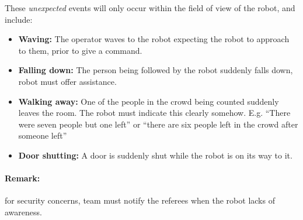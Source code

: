 These \textit{unexpected} events will only occur within the field of view of the robot, and include:
\begin{itemize}
	\item \textbf{Waving:} The operator waves to the robot expecting the robot to approach to them, prior to give a command.
	\item \textbf{Falling down:} The person being followed by the robot suddenly falls down, robot must offer assistance.
	\item \textbf{Walking away:} One of the people in the crowd being counted suddenly leaves the room. The robot must indicate this clearly somehow. 
	  E.g. ``There were seven people but one left'' or ``there are six people left in the crowd after someone left''
	\item \textbf{Door shutting:} A door is suddenly shut while the robot is on its way to it.
\end{itemize}

\paragraph*{Remark:} for security concerns, team must notify the referees when the robot lacks of awareness.

